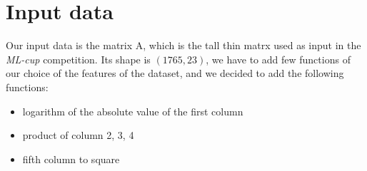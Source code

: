 \documentclass{article}
\begin{document}
\section{Input data}
Our input data is the matrix A, which is the tall thin matrx used as input in the \textit{ML-cup} competition. Its shape is $(1765, 23)$, we have to add few functions of our choice of the features of the dataset, and we decided to add the following functions:
\begin{itemize}
	\item logarithm of the absolute value of the first column
	\item product of column 2, 3, 4
	\item fifth column to square
\end{itemize}
\end{document}
